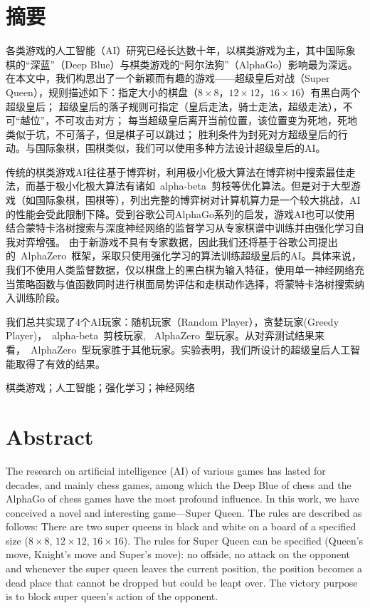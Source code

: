 \chapter*{摘要}

各类游戏的人工智能（AI）研究已经长达数十年，以棋类游戏为主，其中国际象棋的“深蓝”（Deep Blue）与棋类游戏的“阿尔法狗”（AlphaGo）影响最为深远。
在本文中，我们构思出了一个新颖而有趣的游戏——超级皇后对战（Super Queen），规则描述如下：指定大小的棋盘（$8\times8$，$12\times12$，$16\times16$）有黑白两个超级皇后；
超级皇后的落子规则可指定（皇后走法，骑士走法，超级走法），不可“越位”，不可攻击对方；
每当超级皇后离开当前位置，该位置变为死地，死地类似于坑，不可落子，但是棋子可以跳过；
胜利条件为封死对方超级皇后的行动。与国际象棋，围棋类似，我们可以使用多种方法设计超级皇后的AI。


传统的棋类游戏AI往往基于博弈树，利用极小化极大算法在博弈树中搜索最佳走法，而基于极小化极大算法有诸如~alpha-beta~剪枝等优化算法。但是对于大型游戏（如国际象棋，围棋等），列出完整的博弈树对计算机算力是一个较大挑战，AI的性能会受此限制下降。受到谷歌公司AlphaGo系列的启发，游戏AI也可以使用结合蒙特卡洛树搜索与深度神经网络的监督学习从专家棋谱中训练并由强化学习自我对弈增强。
由于新游戏不具有专家数据，因此我们还将基于谷歌公司提出的~AlphaZero~框架，采取只使用强化学习的算法训练超级皇后的AI。具体来说，我们不使用人类监督数据，仅以棋盘上的黑白棋为输入特征，使用单一神经网络充当策略函数与值函数同时进行棋面局势评估和走棋动作选择，将蒙特卡洛树搜索纳入训练阶段。


我们总共实现了4个AI玩家：随机玩家（Random Player），贪婪玩家(Greedy Player)，~alpha-beta~剪枝玩家, ~AlphaZero~型玩家。从对弈测试结果来看，~AlphaZero~型玩家胜于其他玩家。实验表明，我们所设计的超级皇后人工智能取得了有效的结果。

\medskip
{} 棋类游戏；人工智能；强化学习；神经网络

\chapter*{Abstract}

The research on artificial intelligence (AI) of various games has lasted for decades, and mainly chess games, among which the Deep Blue of chess and the AlphaGo of chess games have the most profound influence.
In this work, we have conceived a novel and interesting game---Super Queen. The rules are described as follows: There are two super queens in black and white on a board of a specified size ($8\times8$, $12\times12$, $16\times16$). 
The rules for Super Queen can be specified (Queen's move, Knight's move and Super's move): no offside, no attack on the opponent and whenever the super queen leaves the current position, the position becomes a dead place that cannot be dropped but could be leapt over. The victory purpose is to block super queen's action of the opponent.



